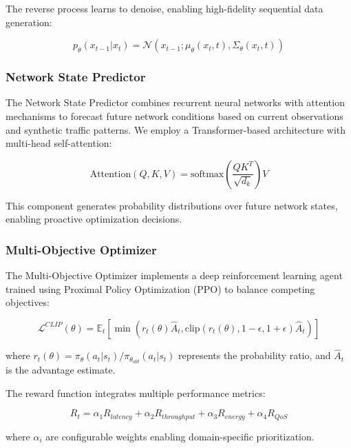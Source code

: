 \documentclass[conference]{IEEEtran}
\begin{document}
The reverse process learns to denoise, enabling high-fidelity sequential data generation:

\begin{equation}
p_\theta(x_{t-1}|x_t) = \mathcal{N}(x_{t-1}; \mu_\theta(x_t,t), \Sigma_\theta(x_t,t))
\end{equation}

\subsubsection{Network State Predictor}

The Network State Predictor combines recurrent neural networks with attention mechanisms to forecast future network conditions based on current observations and synthetic traffic patterns. We employ a Transformer-based architecture with multi-head self-attention:

\begin{equation}
\text{Attention}(Q,K,V) = \text{softmax}\left(\frac{QK^T}{\sqrt{d_k}}\right)V
\end{equation}

This component generates probability distributions over future network states, enabling proactive optimization decisions.

\subsubsection{Multi-Objective Optimizer}

The Multi-Objective Optimizer implements a deep reinforcement learning agent trained using Proximal Policy Optimization (PPO) to balance competing objectives:

\begin{equation}
\mathcal{L}^{CLIP}(\theta) = \mathbb{E}_t\left[\min(r_t(\theta)\hat{A}_t, \text{clip}(r_t(\theta), 1-\epsilon, 1+\epsilon)\hat{A}_t)\right]
\end{equation}

where $r_t(\theta) = \pi_\theta(a_t|s_t) / \pi_{\theta_{old}}(a_t|s_t)$ represents the probability ratio, and $\hat{A}_t$ is the advantage estimate.

The reward function integrates multiple performance metrics:

\begin{equation}
R_t = \alpha_1 R_{latency} + \alpha_2 R_{throughput} + \alpha_3 R_{energy} + \alpha_4 R_{QoS}
\end{equation}

where $\alpha_i$ are configurable weights enabling domain-specific prioritization.
\end{document}
